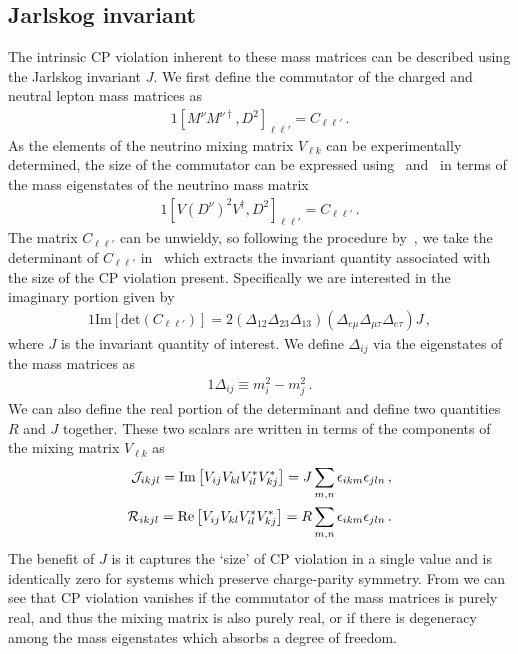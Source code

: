 \subsection{Jarlskog invariant}
\label{sec:jscalar}
The intrinsic CP violation inherent to these mass matrices can be described using the Jarlskog invariant $J$. We first define the commutator of the charged and neutral lepton mass matrices as 
\begin{alignat}{1}
	\label{comm:1} [M^{\nu}M^{\nu\dag},D^{2}]_{\ell\ell'} = C_{\ell\ell'}\,.
\end{alignat}
As the elements of the neutrino mixing matrix $V_{\ell k}$ can be experimentally determined, the size of the commutator can be expressed using~ and~ in terms of the mass eigenstates of the neutrino mass matrix
\begin{alignat}{1}
	\label{comm:2} [V(D^{\nu})^{2}V^{\dag},D^{2}]_{\ell\ell'} = C_{\ell\ell'}\,.
\end{alignat}
The matrix $C_{\ell\ell'}$ can be unwieldy, so following the procedure by~\citep{Jarlskog:1985ht,Jarlskog:1985cw,Jarlskog:2004be}, we take the determinant of $C_{\ell\ell'}$ in~ which extracts the invariant quantity associated with the size of the CP violation present. Specifically we are interested in the imaginary portion given by
\begin{alignat}{1}
	\label{det:1} \mathrm{Im}\left[\mathrm{det}(C_{\ell\ell'})\right]=2\left(\Delta_{12}\Delta_{23}\Delta_{13}\right)\left(\Delta_{e\mu}\Delta_{\mu\tau}\Delta_{e\tau}\right)J\,,
\end{alignat}
where $J$ is the invariant quantity of interest. We define $\Delta_{ij}$ via the eigenstates of the mass matrices as
\begin{alignat}{1}
	\label{delta:1} \Delta_{ij}\equiv m^{2}_{i}-m^{2}_{j}\,.
\end{alignat}
We can also define the real portion of the determinant and define two quantities $R$ and $J$ together. These two scalars are written in terms of the components of the mixing matrix $V_{\ell k}$ as
\begin{alignat}{1}
	\label{j:1}
    {\cal J}_{ikjl} = \mathrm{Im}\left[V_{ij}V_{kl}V^{*}_{il}V^{*}_{kj}\right]=J\sum_{m,n}\epsilon_{ikm}\epsilon_{jln}\,,\\
    \label{j:2}
    {\cal R}_{ikjl} = \mathrm{Re}\left[V_{ij}V_{kl}V^{*}_{il}V^{*}_{kj}\right]=R\sum_{m,n}\epsilon_{ikm}\epsilon_{jln}\,.
\end{alignat}
The benefit of $J$ is it captures the `size' of CP violation in a single value and is identically zero for systems which preserve charge-parity symmetry. From  we can see that CP violation vanishes if the commutator of the mass matrices is purely real, and thus the mixing matrix is also purely real, or if there is degeneracy among the mass eigenstates which absorbs a degree of freedom.

